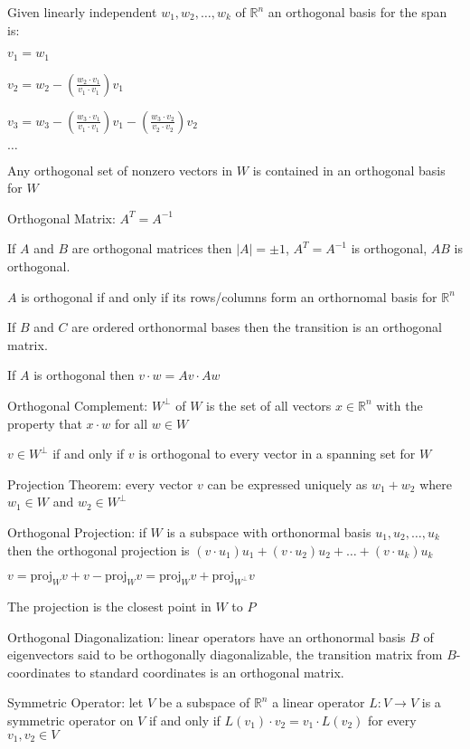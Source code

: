 Given linearly independent ${w_1,w_2,\dots,w_k}$ of $\mathbb{R}^n$ an orthogonal basis for the span is:

$v_1 = w_1$

$v_2 = w_2 - \left(\frac{w_2 \cdot v_1}{v_1 \cdot v_1} \right) v_1$

$v_3 = w_3 - \left(\frac{w_3 \cdot v_1}{v_1 \cdot v_1} \right) v_1 - \left(\frac{w_3 \cdot v_2}{v_2 \cdot v_2} \right) v_2$

$\dots$

Any orthogonal set of nonzero vectors in $W$ is contained in an orthogonal basis for $W$

Orthogonal Matrix: $A^T = A^{-1}$

If $A$ and $B$ are orthogonal matrices then $|A|=\pm 1$, $A^T=A^{-1}$ is orthogonal, $AB$ is orthogonal.

$A$ is orthogonal if and only if its rows/columns form an orthornomal basis for $\mathbb{R}^n$

If $B$ and $C$ are ordered orthonormal bases then the transition is an orthogonal matrix.

If $A$ is orthogonal then $v \cdot w = Av \cdot Aw$

Orthogonal Complement: $W^{\perp}$ of $W$ is the set of all vectors $x \in \mathbb{R}^n$ with the property that $x \cdot w$ for all $w \in W$

$v \in W^{\perp}$ if and only if $v$ is orthogonal to every vector in a spanning set for $W$

Projection Theorem: every vector $v$ can be expressed uniquely as $w_1+w_2$ where $w_1 \in W$ and $w_2 \in W^{\perp}$

Orthogonal Projection: if $W$ is a subspace with orthonormal basis ${u_1,u_2,\dots,u_k}$ then the orthogonal projection is $(v \cdot u_1) u_1 + (v \cdot u_2) u_2 + \dots + (v \cdot u_k) u_k$

$v=\text{proj}_W v +v-\text{proj}_W v=\text{proj}_W v+\text{proj}_{W^{\perp}} v$

The projection is the closest point in $W$ to $P$

Orthogonal Diagonalization: linear operators have an orthonormal basis $B$ of eigenvectors said to be orthogonally diagonalizable, the transition matrix from $B$-coordinates to standard coordinates is an orthogonal matrix.

Symmetric Operator: let $V$ be a subspace of $\mathbb{R}^n$ a linear operator $L: V \to V$ is a symmetric operator on $V$ if and only if $L(v_1) \cdot v_2 = v_1 \cdot L(v_2)$ for every $v_1 , v_2 \in V$

